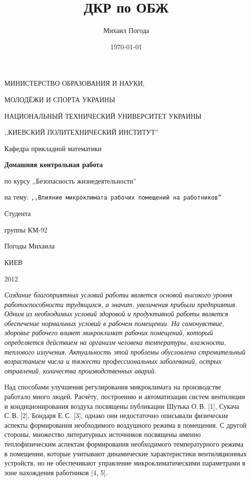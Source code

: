 \documentclass[a4paper,12pt,notitlepage,pdftex,headsepline]{scrartcl}
\author{Михаил Погода}
\title{ДКР по ОБЖ}
\date{\today}
\begin{document}
  \thispagestyle{empty}
  \begin{center}
    \large
    \MakeUppercase{Министерство образования и науки,}

    \MakeUppercase{молодёжи и спорта Украины}

    \MakeUppercase{Национальный технический университет Украины}

    \MakeUppercase{,,Киевский политехнический институт''}

    \addvspace{6pt}

    \normalsize
    Кафедра прикладной математики

    \vfill

    \textbf{Домашняя контрольная работа}

    по курсу ,,Безопасность жизнедеятельности''

    \addvspace{6pt}

    на тему:
    \texttt{,,Влияние микроклимата рабочих помещений на работников''}
  \end{center}

  \vfill

  \begin{flushright}
    Студента

    группы КМ-92

    Погоды Михаила
  \end{flushright}

  \vfill

  \begin{center}
    КИЕВ

    2012
  \end{center}
  \newpage

  \textit{Создание благоприятных условий работы является основой высокого
    уровня работоспособности трудящихся, а значит, увеличения прибыли
    предприятия.
    Одним из необходимых условий здоровой и продуктивной работы является
    обеспечение нормальных условий в рабочем помещении.
    На самочувствие, здоровье рабочего влияет микроклимат рабочих помещений,
    который определяется действием на организм человека температуры, влажности,
    теплового излучения.
    Актуальность этой проблемы обусловлена стремительный возрастанием числа и
    тяжести профессиональных заболеваний, острых отравлений, количества
    производственных аварий.
  }

  Над способами улучшения регулирования микроклимата на производстве работало
  много людей.
  Расчёту, построению и автоматизации систем вентиляции и кондиционирования
  воздуха посвящены публикации Шутька О.\,В. [1], Сукача С.\,В. [2], Бондаря
  Е.\,С. [3], однако они недостаточно описывали физические аспекты
  формирования необходимого воздушного режима в помещения.
  С другой стороны, множество литературных источников посвящены именно
  теплофизическим аспектам формирования необходимого температурного режима в
  помещении, которые учитывают динамические характеристики вентиляционных
  устройств, но не обеспечивают управление микроклиматическими параметрами в
  зоне нахождения работников [4, 5].
\end{document}
